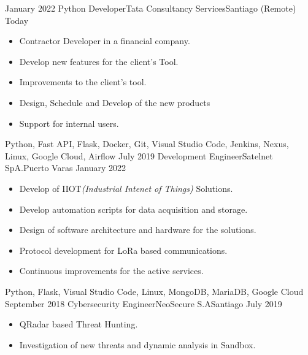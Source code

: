 %
%
%

\begin{experiences}
  \experience
    {January 2022}   {Python Developer}{Tata Consultancy Services}{Santiago (Remote)}
    {Today} 
    {
      \begin{itemize}
        \item Contractor Developer in a financial company.
        \item Develop new features for the client's Tool.
        \item Improvements to the client's tool.
        \item Design, Schedule and Develop of the new products
        \item Support for internal users.
      \end{itemize}
    }{Python, Fast API, Flask, Docker, Git, Visual Studio Code, Jenkins, Nexus, Linux, Google Cloud, Airflow}
  \emptySeparator
  \experience
    {July 2019} {Development Engineer}{Satelnet SpA.}{Puerto Varas}
    {January 2022}    
    {
      \begin{itemize}
        \item Develop of IIOT{\it (Industrial Intenet of Things)} Solutions.
        \item Develop automation scripts for data acquisition and storage.
        \item Design of software architecture and hardware for the solutions.
        \item Protocol development for LoRa based communications.
        \item Continuous improvements for the active services.                           
      \end{itemize}
    }{Python, Flask, Visual Studio Code, Linux, MongoDB, MariaDB, Google Cloud}
  \emptySeparator
  \experience
    {September 2018}     {Cybersecurity Engineer}{NeoSecure S.A}{Santiago}
    {July 2019}    
    {
      \begin{itemize}
        \item QRadar based Threat Hunting.
        \item Investigation of new threats and dynamic analysis in Sandbox.              

\end{itemize}}
\end{experiences}
